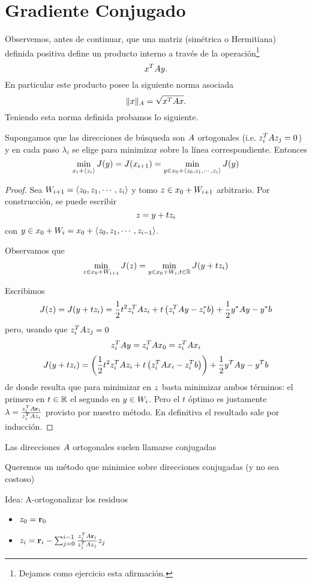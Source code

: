 \section{Gradiente Conjugado}
Observemos, antes de continuar, que una matriz (simétrica o Hermitiana) definida positiva define un producto interno a través de la operación\footnote{Dejamos como ejercicio esta afirmación.}
$$
\xb^T\Ab\yb.
$$
En particular este producto posee la siguiente norma asociada 
$$
\|\xb\|_A=\sqrt{\xb^T\Ab\xb}.
$$
Teniendo esta norma definida probamos lo siguiente.
\tcc
\begin{lema}
Supongamos que las direcciones de búsqueda son $\Ab$ ortogonales (i.e. $\zb_i^T\Ab\zb_j=0$) y en cada paso $\lambda_i$ se elige para minimizar sobre la línea correspondiente. Entonces
$$
\min_{\xb_i+\langle \zb_i\rangle}J(\yb)=J(\xb_{i+1})=\min_{\yb\in \xb_0+\langle \zb_0,\zb_1,\cdots,\zb_i \rangle} J(\yb)
$$
\end{lema}
\etcc
\begin{proof}
 Sea $W_{i+1}=\langle \zb_0,\zb_1,\cdots,\zb_i \rangle$ y tomo $\zb\in \xb_0+W_{i+1}$ arbitrario. Por construcción, se puede escribir 
 $$\zb=\yb+t\zb_i$$ con $\yb\in \xb_0+ W_i=\xb_0+\langle \zb_0,\zb_1,\cdots,\zb_{i-1} \rangle$. 
 
 Observamos que  
  $$
 \min_{\zb\in \xb_0+W_{i+1}}J(\zb)=\min_{\yb\in\xb_0+W_{i},t \in \R} J(\yb+t \zb_i) 
 $$

 $$
 $$
Escribimos 
$$
J(z)=J(\yb+t\zb_i)=\frac{1}{2}t^2\zb_i^T\Ab\zb_i+t\left(\zb_i^T\Ab\yb-\zb_i^*\bb\right) +\frac{1}{2}\yb^*\Ab\yb-\yb^*\bb
$$
pero, usando que $\zb_i^T\Ab\zb_j=0$ 
$$
\zb_i^T\Ab\yb=\zb_i^T\Ab\xb_0=\zb_i^T\Ab\xb_i
$$
$$
J(\yb+t\zb_i)=\left(\frac{1}{2}t^2\zb_i^T\Ab\zb_i+t\left(\zb_i^T\Ab\xb_i-\zb_i^T\bb\right)\right) +\frac{1}{2}\yb^T\Ab\yb-\yb^T\bb
$$
de donde resulta que 
para minimizar en $\zb$ basta minimizar ambos términos: el primero en $t\in \mathbb R$ el segundo en $\yb\in W_i$. Pero el $t$ óptimo es justamente $\lambda=\frac{\zb_i^T\Ab\rb_i}{\zb_i^T\Ab\zb_i}$ provisto por nuestro método. En definitiva
  el resultado sale por inducción.
\end{proof}

\tccdefi
\begin{center}Las direcciones $\Ab$ ortogonales suelen llamarse conjugadas
\end{center}
\etcc
Queremos un método que minimice sobre direcciones conjugadas (y no sea costoso)

Idea: A-ortogonalizar los residuos
\begin{itemize}
 \item $\zb_0=\rb_0$
 \item $\zb_i=\rb_i-\sum_{j=0}^{i-1}\frac{\zb_j^T\Ab\rb_i}{\zb_j^T\Ab\zb_j}\zb_j$
\end{itemize}
 


